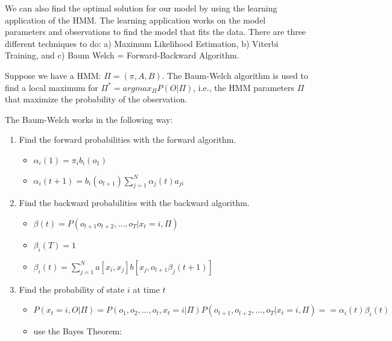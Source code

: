 We can also find the optimal solution for our model by using the learning application of the HMM. The learning application works on the model parameters and observations to find the model that fits the data. There are three different techniques to do: a) Maximum Likelihood Estimation, b) Viterbi Training, and c) Baum  Welch = Forward-Backward Algorithm. 


Suppose we have a HMM: $\Pi = (\pi, A, B)$. The Baum-Welch algorithm is used to find  a local maximum for $\Pi^* = arg max_{\Pi} P (O | \Pi)$, i.e., the HMM parameters $\Pi$ that maximize the probability of the observation.

The Baum-Welch works in the following way:

\begin{enumerate}


\item Find the forward probabilities with the forward algorithm.


\begin{itemize}
\item $\alpha_{i}(1) = \pi_{i} b_{i} (o_{1})$
\item $\alpha_{i}(t + 1) = b_{i}(o_{t+1}) \sum\limits^{N}_{j=1}\alpha_{j}(t)a_{ji}$

\end{itemize}

\item Find the backward probabilities with the backward algorithm.

\begin{itemize}
\item $\beta(t) = P(o_{t+1} o_{t+2},...,o_{T} | x_{t} = i, \Pi) $

\item $\beta_{i}(T) = 1$
\item $\beta_{i}(t) = \sum\limits^{N}_{j=1} a[x_i, x_j] b[x_j,o_{t + 1}\beta_{j}(t + 1)]$

\end{itemize}
\item Find the probability of state $i$ at time $t$

\begin{itemize}

\item $P (x_t = i, O | \Pi) = P (o_1, o_2,...,o_t, x_t = i | \Pi) P (o_{t + 1}, o_{t + 2},...,o_{T} | x_{t} = i, \Pi) == \alpha_{i}(t) \beta_{i}(t) $

\item use the Bayes Theorem:


\end{itemize}
\end{enumerate}
